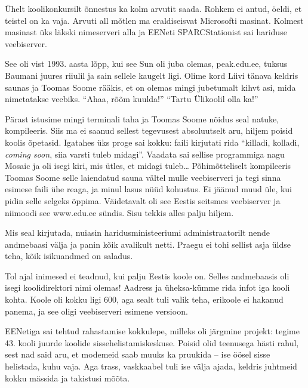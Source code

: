 Ühelt koolikonkursilt õnnestus ka kolm arvutit saada. Rohkem ei antud, 
öeldi, et teistel on ka vaja. Arvuti all mõtlen ma eraldiseisvat 
Microsofti masinat. Kolmest masinast üks läkski nimeserveri alla ja 
EENeti SPARCStationist sai hariduse veebiserver. 

See oli vist 1993. aasta lõpp, kui see Sun oli juba olemas, 
peak.edu.ee, tuksus Baumani juures riiulil ja 
sain sellele kaugelt ligi. Olime kord Liivi tänava keldris saunas ja Toomas Soome 
rääkis, et on olemas mingi jubetumalt kihvt asi, mida nimetatakse veebiks. 
\enquote{Ahaa, rõõm kuulda!} \enquote{Tartu Ülikoolil olla ka!} 

Pärast istusime mingi terminali taha ja Toomas Soome nõidus seal 
natuke, kompileeris. Siis ma ei saanud sellest tegevusest absoluutselt aru, hiljem
poisid koolis õpetasid. Igatahes üks proge sai 
kokku: faili kirjutati rida \enquote{killadi, kolladi, 
\emph{coming soon}, siia varsti tuleb midagi}. Vaadata sai sellise
programmiga nagu Mosaic ja oli isegi kiri, mis 
ütles, et midagi tuleb\ldots{ }Põhimõtteliselt kompileeris Toomas Soome selle laiendatud 
sauna vältel mulle veebiserveri ja tegi sinna esimese faili ühe 
reaga, ja minul lasus nüüd kohustus. Ei jäänud muud üle, kui pidin selle 
selgeks õppima. Väidetavalt oli see Eestis seitsmes veebiserver ja 
niimoodi see www.edu.ee sündis. Sisu tekkis alles palju 
hiljem.


Mis seal kirjutada, nuiasin haridusministeeriumi 
administraatorilt nende andmebaasi välja ja panin kõik avalikult netti. Praegu ei tohi sellist asja üldse teha, kõik isikuandmed on 
saladus.


Tol ajal inimesed ei teadnud, kui palju Eestis koole on. Selles andmebaasis 
oli isegi koolidirektori nimi olemas! Aadress ja üheksa-kümme rida 
infot iga kooli kohta. Koole oli kokku ligi 600, aga sealt tuli valik 
teha, erikoole ei hakanud panema, ja see oligi veebiserveri esimene 
versioon. 

EENetiga sai
tehtud rahastamise kokkulepe, milleks oli järgmine projekt: tegime
43. kooli juurde koolide 
sissehelistamiskeskuse. Poisid olid teenusega hästi rahul, sest nad said 
aru, et modemeid saab muuks ka pruukida -- ise öösel sisse helistada, 
kuhu vaja. Aga trass, vaskkaabel tuli ise välja ajada, 
keldris juhtmeid kokku mässida ja takistusi mõõta. 

